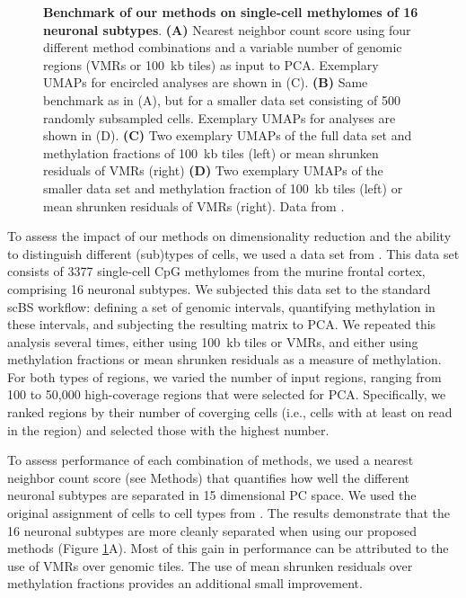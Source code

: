 \documentclass[twocolumn,10pt]{article}
\begin{document}
\begin{figure}
\begin{center}
		\caption{\small \textbf{Benchmark of our methods on single-cell methylomes of 16 neuronal subtypes}. \textbf{(A)} Nearest neighbor count score using four different method combinations and a variable number of genomic regions (VMRs or 100~kb tiles) as input to PCA. Exemplary UMAPs for encircled analyses are shown in (C). \textbf{(B)} Same benchmark as in (A), but for a smaller data set consisting of 500 randomly subsampled cells. Exemplary UMAPs for analyses are shown in (D). \textbf{(C)} Two exemplary UMAPs of the full data set and methylation fractions of 100~kb tiles (left) or mean shrunken residuals of VMRs (right) \textbf{(D)} Two exemplary UMAPs of the smaller data set and methylation fraction of 100~kb tiles (left) or mean shrunken residuals of VMRs (right). Data from \citet{luo2017single}.}
		\label{figure:score}
	\end{center}
\end{figure}

To assess the impact of our methods on dimensionality reduction and the ability to distinguish different (sub)types of cells, we used a data set from \citet{luo2017single}. This data set consists of 3377 single-cell CpG methylomes from the murine frontal cortex, comprising 16 neuronal subtypes.
We subjected this data set to the standard scBS workflow: defining a set of genomic intervals, quantifying methylation in these intervals, and subjecting the resulting matrix to PCA.
We repeated this analysis several times, either using 100~kb tiles or VMRs, and either using methylation fractions or mean shrunken residuals as a measure of methylation. 
For both types of regions, we varied the number of input regions, ranging from 100 to 50,000 high-coverage regions that were selected for PCA.
Specifically, we ranked regions by their number of coverging cells (i.e., cells with at least on read in the region) and selected those with the highest number.

To assess performance of each combination of methods, we used a nearest neighbor count score (see Methods) that quantifies how well the different neuronal subtypes are separated in 15 dimensional PC space. We used the original assignment of cells to cell types from \citet{luo2017single}.
The results demonstrate that the 16 neuronal subtypes are more cleanly separated when using our proposed methods (Figure \ref{figure:score}A).
Most of this gain in performance can be attributed to the use of VMRs over genomic tiles. The use of mean shrunken residuals over methylation fractions provides an additional small improvement.
\end{document}
